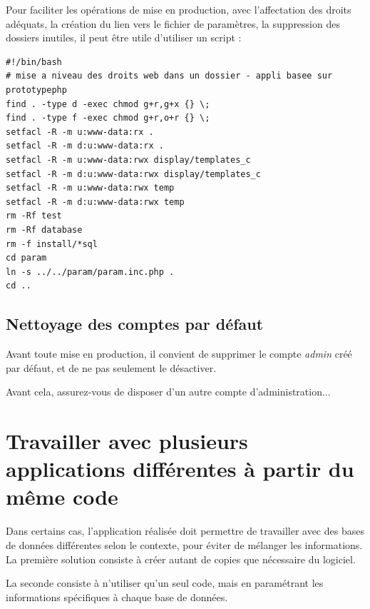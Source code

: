 Pour faciliter les opérations de mise en production, avec l'affectation des droits adéquats, la création du lien vers le fichier de paramètres, la suppression des dossiers inutiles, il peut être utile d'utiliser un script :

\begin{lstlisting}
#!/bin/bash
# mise a niveau des droits web dans un dossier - appli basee sur prototypephp
find . -type d -exec chmod g+r,g+x {} \;
find . -type f -exec chmod g+r,o+r {} \;
setfacl -R -m u:www-data:rx .
setfacl -R -m d:u:www-data:rx .
setfacl -R -m u:www-data:rwx display/templates_c
setfacl -R -m d:u:www-data:rwx display/templates_c
setfacl -R -m u:www-data:rwx temp
setfacl -R -m d:u:www-data:rwx temp
rm -Rf test
rm -Rf database
rm -f install/*sql
cd param
ln -s ../../param/param.inc.php .
cd ..

\end{lstlisting}


\subsection{Nettoyage des comptes par défaut}

Avant toute mise en production, il convient de supprimer le compte \textit{admin} créé par défaut, et de ne pas seulement le désactiver. 

Avant cela, assurez-vous de disposer d'un autre compte d'administration...

\section{Travailler avec plusieurs applications différentes à partir du même code}\label{dnsmultiple}

Dans certains cas, l'application réalisée doit permettre de travailler avec des bases de données différentes selon le contexte, pour éviter de mélanger les informations. La première solution consiste à créer autant de copies que nécessaire du logiciel.

La seconde consiste à n'utiliser qu'un seul code, mais en paramétrant les informations spécifiques à chaque base de données.

